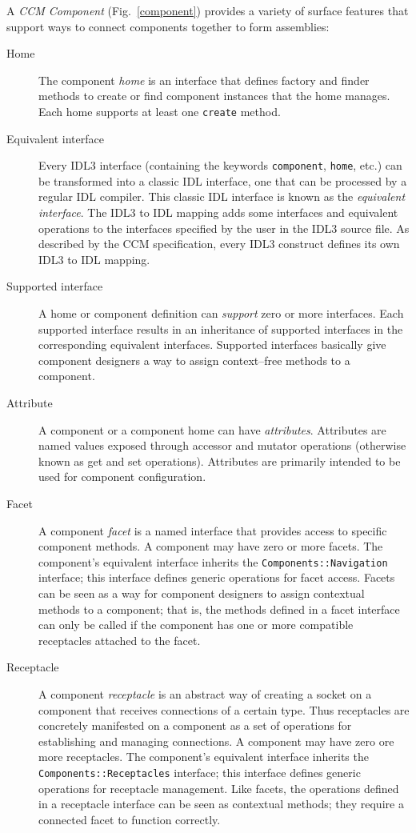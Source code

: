 A {\it CCM Component} (Fig.~\ref{component}) provides a variety of surface
features that support ways to connect components together to form assemblies:
\begin{description}

\item [Home]
The component {\it home} is an interface that defines factory and finder methods
to create or find component instances that the home manages. Each home supports
at least one {\tt create} method.

\item [Equivalent interface]
Every IDL3 interface (containing the keywords {\tt component}, {\tt home}, etc.)
can be transformed into a classic IDL interface, one that can be processed by a
regular IDL compiler. This classic IDL interface is known as the {\it equivalent
interface\/}. The IDL3 to IDL mapping adds some interfaces and equivalent
operations to the interfaces specified by the user in the IDL3 source file. As
described by the CCM specification, every IDL3 construct defines its own IDL3 to
IDL mapping.

\item [Supported interface]
A home or component definition can {\it support} zero or more interfaces. Each
supported interface results in an inheritance of supported interfaces in the
corresponding equivalent interfaces. Supported interfaces basically give
component designers a way to assign context--free methods to a component.

\item [Attribute]
A component or a component home can have {\it attributes\/}. Attributes are
named values exposed through accessor and mutator operations (otherwise known as
get and set operations). Attributes are primarily intended to be used for
component configuration.

\item [Facet]
A component {\it facet} is a named interface that provides access to specific
component methods. A component may have zero or more facets. The component's
equivalent interface inherits the {\tt Components::Navigation} interface; this
interface defines generic operations for facet access. Facets can be seen as a
way for component designers to assign contextual methods to a component; that
is, the methods defined in a facet interface can only be called if the component
has one or more compatible receptacles attached to the facet.

\item [Receptacle]
A component {\it receptacle} is an abstract way of creating a socket on a
component that receives connections of a certain type. Thus receptacles are
concretely manifested on a component as a set of operations for establishing and
managing connections. A component may have zero ore more receptacles. The
component's equivalent interface inherits the {\tt Components::Receptacles}
interface; this interface defines generic operations for receptacle management.
Like facets, the operations defined in a receptacle interface can be seen as
contextual methods; they require a connected facet to function correctly.


\end{description}
